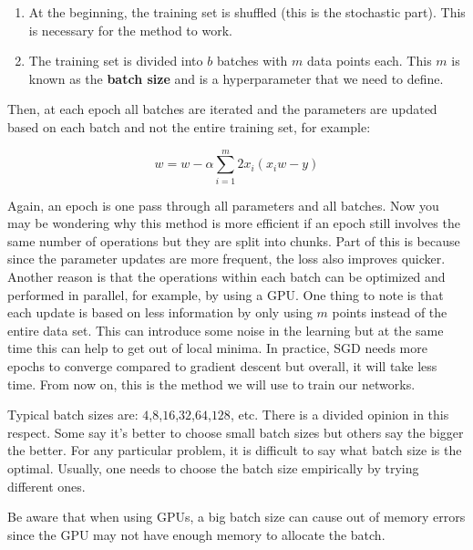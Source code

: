 \documentclass[
  11pt,
]{krantz}
\makeatletter
\providecommand{\tightlist}{%
  \setlength{\itemsep}{0pt}\setlength{\parskip}{0pt}}
\newenvironment{kframe}{%
\medskip{}
\setlength{\fboxsep}{.8em}
 \def\at@end@of@kframe{}%
 \ifinner\ifhmode%
  \def\at@end@of@kframe{\end{minipage}}%
  \begin{minipage}{\columnwidth}%
 \fi\fi%
 \def\FrameCommand##1{\hskip\@totalleftmargin \hskip-\fboxsep
 \colorbox{shadecolor}{##1}\hskip-\fboxsep
     \hskip-\linewidth \hskip-\@totalleftmargin \hskip\columnwidth}%
 \MakeFramed {\advance\hsize-\width
   \@totalleftmargin\z@ \linewidth\hsize
   \@setminipage}}%
 {\par\unskip\endMakeFramed%
 \at@end@of@kframe}
\newenvironment{rmdblock}[1]
  {
  \begin{itemize}
  \renewcommand{\labelitemi}{
    \raisebox{-.7\height}[0pt][0pt]{
      {\setkeys{Gin}{width=3em,keepaspectratio}\texttt{[image: images/icons/\#1]}}
    }
  }
  \setlength{\fboxsep}{1em}
  \begin{kframe}
  \item
  }
  {
  \end{kframe}
  \end{itemize}
  }
\newenvironment{rmdcaution}
  {\begin{rmdblock}{caution}}
  {\end{rmdblock}}
\newenvironment{rmdinfo}
  {\begin{rmdblock}{info}}
  {\end{rmdblock}}
\makeatother
\begin{document}
\begin{enumerate}
\def\labelenumi{\arabic{enumi}.}
\tightlist
\item
  At the beginning, the training set is shuffled (this is the stochastic part). This is necessary for the method to work.
\item
  The training set is divided into \(b\) batches with \(m\) data points each. This \(m\) is known as the \textbf{batch size} and is a hyperparameter that we need to define.
\end{enumerate}

Then, at each epoch all batches are iterated and the parameters are updated based on each batch and not the entire training set, for example:

\begin{equation}
  w = w - \alpha \sum_{i=1}^m{2x_i(x_i w - y)}
\end{equation}

Again, an epoch is one pass through all parameters and all batches. Now you may be wondering why this method is more efficient if an epoch still involves the same number of operations but they are split into chunks. Part of this is because since the parameter updates are more frequent, the loss also improves quicker. Another reason is that the operations within each batch can be optimized and performed in parallel, for example, by using a GPU. One thing to note is that each update is based on less information by only using \(m\) points instead of the entire data set. This can introduce some noise in the learning but at the same time this can help to get out of local minima. In practice, SGD needs more epochs to converge compared to gradient descent but overall, it will take less time. From now on, this is the method we will use to train our networks.

\begin{rmdinfo}
Typical batch sizes are: \(4\),\(8\),\(16\),\(32\),\(64\),\(128\), etc. There is a divided opinion in this respect. Some say it's better to choose small batch sizes but others say the bigger the better. For any particular problem, it is difficult to say what batch size is the optimal. Usually, one needs to choose the batch size empirically by trying different ones.
\end{rmdinfo}

\begin{rmdcaution}
Be aware that when using GPUs, a big batch size can cause out of memory errors since the GPU may not have enough memory to allocate the batch.
\end{rmdcaution}
\end{document}
